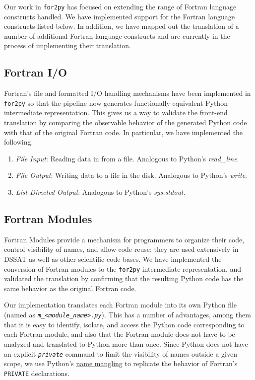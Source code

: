 \documentclass[article, 12pt, oneside]{memoir}
\begin{document}
Our work in \texttt{for2py} has focused on extending the range of
Fortran language constructs handled. We have implemented support for the
Fortran language constructs listed below. In addition, we have mapped
out the translation of a number of additional Fortran language
constructs and are currently in the process of implementing their
translation.

\hypertarget{fortran-io}{%
\subsection{Fortran I/O}\label{fortran-io}}

Fortran's file and formatted I/O handling mechanisms have been
implemented in \texttt{for2py} so that the pipeline now generates
functionally equivalent Python intermediate representation. This gives
us a way to validate the front-end translation by comparing the
observable behavior of the generated Python code with that of the
original Fortran code. In particular, we have implemented the following:

\begin{enumerate}
\def\labelenumi{\arabic{enumi}.}
\tightlist
\item
  \emph{File Input}: Reading data in from a file. Analogous to Python's
  \emph{read\_line}.
\item
  \emph{File Output}: Writing data to a file in the disk. Analogous to
  Python's \emph{write}.
\item
  \emph{List-Directed Output}: Analogous to Python's \emph{sys.stdout}.
\end{enumerate}

\hypertarget{fortran-modules}{%
\subsection{Fortran Modules}\label{fortran-modules}}

Fortran Modules provide a mechanism for programmers to organize their
code, control visibility of names, and allow code reuse; they are used
extensively in DSSAT as well as other scientific code bases. We have
implemented the conversion of Fortran modules to the \texttt{for2py}
intermediate representation, and validated the translation by confirming
that the resulting Python code has the same behavior as the original
Fortran code.

Our implementation translates each Fortran module into its own Python
file (named as
\emph{\texttt{m\_\textless{}module\_name\textgreater{}.py}}). This has a
number of advantages, among them that it is easy to identify, isolate,
and access the Python code corresponding to each Fortran module, and
also that the Fortran module does not have to be analyzed and translated
to Python more than once. Since Python does not have an explicit
\emph{\texttt{private}} command to limit the visibility of names outside
a given scope, we use Python's
\href{https://docs.python.org/2/tutorial/classes.html\#private-variables-and-class-local-references}{name
mangling} to replicate the behavior of Fortran's \texttt{PRIVATE}
declarations.
\end{document}
